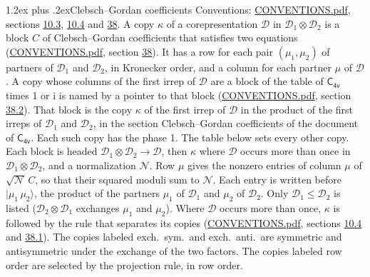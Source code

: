 \documentclass[10pt,a4paper]{article}
\makeatletter
\renewcommand\section{\@startsection{section}{1}{\z@}{-3ex plus -1ex minus -.2ex}%
  {1.2ex plus .2ex}{\normalfont\large\sffamily\bfseries\color{parttitle}}}
\numberwithin{equation}{section}
\newcommand{\grp}[1]{\mathsf{#1}}
\newcommand{\iunit}{\mathrm{i}}
\newcommand{\irrprod}{\otimes}
\newcommand{\mult}{\kappa}
\newcommand{\intx}{\mu}
\newcommand{\cgnorm}{\mathcal{N}}
\newcommand{\prodket}[2]{\lvert {#1}\,{#2}\rangle}
\makeatother
\begin{document}
\section{Clebsch--Gordan coefficients}\label{s:clebsch_gordan}
Conventions: \href{../../CONVENTIONS.pdf}{CONVENTIONS.pdf}, sections \href{../../../rotation/CONVENTIONS.pdf\#conv.10.3}{10.3}, \href{../../../rotation/CONVENTIONS.pdf\#conv.10.4}{10.4} and \href{../../CONVENTIONS.pdf\#conv.38}{38}.
\leavevmode\label{n:index.copy}\label{n:matrix.cg.stored}A copy $\mult$ of a corepresentation $\mathcal{D}$ in $\mathcal{D}_1\irrprod\mathcal{D}_2$ is a block $C$ of Clebsch--Gordan coefficients that satisfies two equations (\href{../../CONVENTIONS.pdf}{CONVENTIONS.pdf}, section \href{../../CONVENTIONS.pdf\#conv.38}{38}). \label{n:index.cg}It has a row for each pair $(\intx_1, \intx_2)$ of partners of $\mathcal{D}_1$ and $\mathcal{D}_2$, in Kronecker order, and a column for each partner $\intx$ of $\mathcal{D}$.
A copy whose columns of the first irrep of $\mathcal{D}$ are a block of the table of $\grp{C_{4v}}$ times 1 or $\iunit$ is named by a pointer to that block (\href{../../CONVENTIONS.pdf}{CONVENTIONS.pdf}, section \href{../../CONVENTIONS.pdf\#conv.38.2}{38.2}). That block is the copy $\mult$ of the first irrep of $\mathcal{D}$ in the product of the first irreps of $\mathcal{D}_1$ and $\mathcal{D}_2$, in the section Clebsch--Gordan coefficients of the document of \href{../../../rotation/data/pdf/C4v.pdf}{$\grp{C_{4v}}$}. Each such copy has the phase 1. The table below sets every other copy.
Each block is headed $\mathcal{D}_1\irrprod\mathcal{D}_2\to\mathcal{D}$, then $\mult$ where $\mathcal{D}$ occurs more than once in $\mathcal{D}_1\irrprod\mathcal{D}_2$, and a normalization $\cgnorm$. Row $\intx$ gives the nonzero entries of column $\intx$ of $\sqrt{\cgnorm}\,C$, so that their squared moduli sum to $\cgnorm$. \label{n:vector.ket.product}Each entry is written before $\prodket{\intx_1}{\intx_2}$, the product of the partners $\intx_1$ of $\mathcal{D}_1$ and $\intx_2$ of $\mathcal{D}_2$. Only $\mathcal{D}_1 \le \mathcal{D}_2$ is listed ($\mathcal{D}_2\irrprod\mathcal{D}_1$ exchanges $\intx_1$ and $\intx_2$).
Where $\mathcal{D}$ occurs more than once, $\mult$ is followed by the rule that separates its copies (\href{../../CONVENTIONS.pdf}{CONVENTIONS.pdf}, sections \href{../../../rotation/CONVENTIONS.pdf\#conv.10.4}{10.4} and \href{../../CONVENTIONS.pdf\#conv.38.1}{38.1}). \label{n:abbreviation.exchange}The copies labeled exch.\ sym.\ and exch.\ anti.\ are symmetric and antisymmetric under the exchange of the two factors. The copies labeled row order are selected by the projection rule, in row order.
\end{document}
